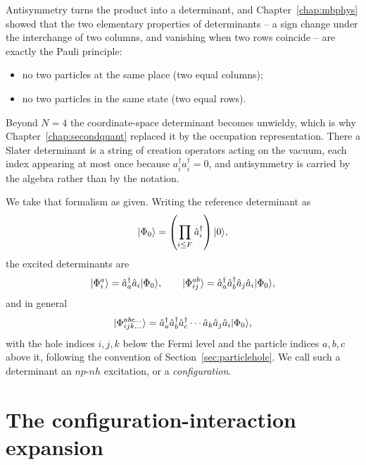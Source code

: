 Antisymmetry turns the product into a determinant, and
Chapter~\ref{chap:mbphys} showed that the two elementary properties of
determinants -- a sign change under the interchange of two columns, and
vanishing when two rows coincide -- are exactly the Pauli principle:
\begin{itemize}
  \item no two particles at the same place (two equal columns);
  \item no two particles in the same state (two equal rows).
\end{itemize}
Beyond $N=4$ the coordinate-space determinant becomes unwieldy, which is why
Chapter~\ref{chap:secondquant} replaced it by the occupation representation.
There a Slater determinant is a string of creation operators acting on the
vacuum, each index appearing at most once because
$a^{\dagger}_i a^{\dagger}_i=0$, and antisymmetry is carried by the algebra
rather than by the notation.

We take that formalism as given.  Writing the reference determinant as
\begin{equation}
  \vert \Phi_0 \rangle = \left(\prod_{i\le F}\hat{a}_i^{\dagger}\right)\vert 0 \rangle,
  \label{eq:5-reference}
\end{equation}
the excited determinants are
\begin{equation}
  \vert \Phi_i^a \rangle = \hat{a}_a^{\dagger}\hat{a}_i\vert \Phi_0 \rangle,
  \qquad
  \vert \Phi_{ij}^{ab} \rangle =
    \hat{a}_a^{\dagger}\hat{a}_b^{\dagger}\hat{a}_j\hat{a}_i\vert \Phi_0 \rangle,
  \label{eq:5-excitations}
\end{equation}
and in general
\begin{equation}
  \vert \Phi_{ijk\dots}^{abc\dots} \rangle =
    \hat{a}_a^{\dagger}\hat{a}_b^{\dagger}\hat{a}_c^{\dagger}\cdots
    \hat{a}_k\hat{a}_j\hat{a}_i\vert \Phi_0 \rangle,
  \label{eq:5-npnh}
\end{equation}
with the hole indices $i,j,k$ below the Fermi level and the particle indices
$a,b,c$ above it, following the convention of
Section~\ref{sec:particlehole}.  We call such a determinant an $np$-$nh$
excitation, or a \emph{configuration}.

\section{The configuration-interaction expansion}
\label{sec:ciexpansion}

